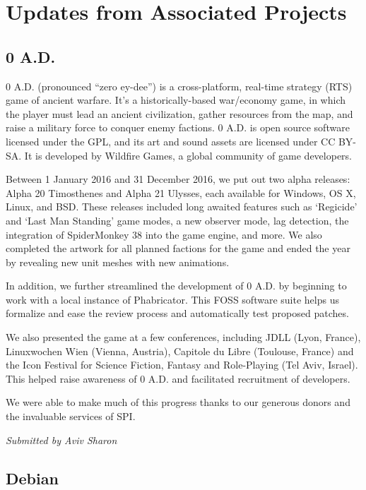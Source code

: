 \documentclass[letterpaper]{report}
\begin{document}
\section{Updates from Associated Projects}

\subsection{0 A.D.}

0 A.D. (pronounced ``zero ey-dee'') is a cross-platform, real-time
strategy (RTS) game of ancient warfare. It's a historically-based
war/economy game, in which the player must lead an ancient civilization,
gather resources from the map, and raise a military force to conquer
enemy factions. 0 A.D. is open source software licensed under the GPL,
and its art and sound assets are licensed under CC BY-SA. It is
developed by Wildfire Games, a global community of game developers.

Between 1 January 2016 and 31 December 2016, we put out two alpha
releases: Alpha 20 Timosthenes and Alpha 21 Ulysses, each available for
Windows, OS X, Linux, and BSD. These releases included long awaited
features such as `Regicide' and `Last Man Standing' game modes, a new
observer mode, lag detection, the integration of SpiderMonkey 38 into
the game engine, and more. We also completed the artwork for all planned
factions for the game and ended the year by revealing new unit meshes
with new animations.

In addition, we further streamlined the development of 0 A.D. by
beginning to work with a local instance of Phabricator. This FOSS
software suite helps us formalize and ease the review process and
automatically test proposed patches.

We also presented the game at a few conferences, including JDLL (Lyon,
France), Linuxwochen Wien (Vienna, Austria), Capitole du Libre
(Toulouse, France) and the Icon Festival for Science Fiction, Fantasy
and Role-Playing (Tel Aviv, Israel). This helped raise awareness of 0
A.D. and facilitated recruitment of developers.

We were able to make much of this progress thanks to our generous donors
and the invaluable services of SPI.

{\em Submitted by Aviv Sharon}

\subsection{Debian}
\end{document}
